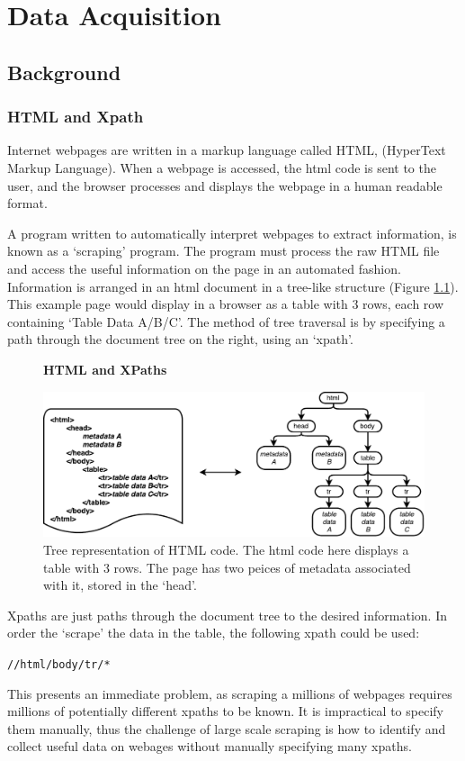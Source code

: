 \chapter{Data Acquisition}
\label{chapt:DATA_ACQUISITION}
\section{Background}
\subsection{HTML and Xpath}

Internet webpages are written in a markup language called HTML, (HyperText Markup Language). When a webpage is accessed, the html code is sent to the user, and the browser processes and displays the webpage in a human readable format. 

A program written to automatically interpret webpages to extract information, is known as a `scraping' program. The program must process the raw HTML file and access the useful information on the page in an automated fashion. Information is arranged in an html document in a tree-like structure (Figure \ref{fig:HTMLTREE}). This example page would display in a browser as a table with 3 rows, each row containing `Table Data A/B/C'. The method of tree traversal is by specifying a path through the document tree on the right, using an `xpath'. 
\begin{figure}[H]
    \centering
    \label{fig:HTMLTREE}
    \textbf{HTML and XPaths}\par\medskip
    \includegraphics[width=\textwidth]{Data_Acquisition/html_tree.pdf}
    \caption{Tree representation of HTML code. The html code here displays a table with 3 rows. The page has two peices of metadata associated with it, stored in the `head'.}
\end{figure}
Xpaths are just paths through the document tree to the desired information. In order the `scrape' the data in the table, the following xpath could be used:
\begin{center}
\texttt{//html/body/tr/*}
\end{center}
This presents an immediate problem, as scraping a millions of webpages requires millions of potentially different xpaths to be known. It is impractical to specify them manually, thus the challenge of large scale scraping is how to identify and collect useful data on webages without manually specifying many xpaths.
